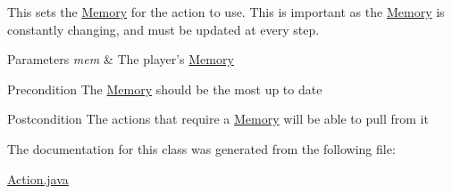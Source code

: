 This sets the \hyperlink{classMemory}{Memory} for the action to use. This is important as the \hyperlink{classMemory}{Memory} is constantly changing, and must be updated at every step. 
\begin{DoxyParams}{Parameters}
{\em mem} & The player's \hyperlink{classMemory}{Memory} \\
\hline
\end{DoxyParams}
\begin{DoxyPrecond}{Precondition}
The \hyperlink{classMemory}{Memory} should be the most up to date 
\end{DoxyPrecond}
\begin{DoxyPostcond}{Postcondition}
The actions that require a \hyperlink{classMemory}{Memory} will be able to pull from it 
\end{DoxyPostcond}


The documentation for this class was generated from the following file:\begin{DoxyCompactItemize}
\item 
\hyperlink{Action_8java}{Action.java}\end{DoxyCompactItemize}
